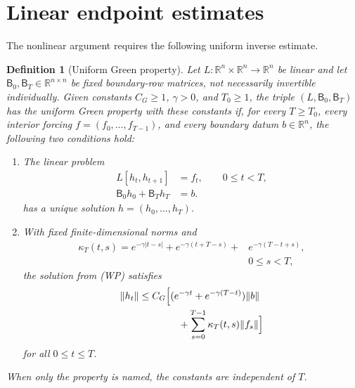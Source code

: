 \documentclass[twocolumn,nameyear,amsthm]{autart}
\newcommand{\R}{\mathbb R}
\newcommand{\Bzero}{\mathsf B_0}
\newcommand{\BT}{\mathsf B_T}
\newcommand{\norm}[1]{\lVert #1\rVert}
\numberwithin{equation}{section}
\newtheorem{definition}[theorem]{Definition}
\begin{document}
\section{Linear endpoint estimates}\label{sec:inverse}
The nonlinear argument requires the following uniform inverse estimate.
\begin{definition}[Uniform Green property]\label{cond:green}
Let $L:\mathbb R^n\times\mathbb R^n\to\mathbb R^n$ be linear and let $\Bzero,\BT\in\mathbb R^{n\times n}$ be fixed boundary-row matrices, not necessarily invertible individually.  Given constants $C_G\ge1$, $\gamma>0$, and $T_0\ge1$, the triple $(L,\Bzero,\BT)$ has the uniform Green property with these constants if, for every $T\ge T_0$, every interior forcing $f=(f_0,\ldots,f_{T-1})$, and every boundary datum $b\in\R^n$, the following two conditions hold:
\begin{enumerate}
\item[(WP)] The linear problem
\begin{equation}\label{eq:linear-bvp}
\begin{aligned}
      L[h_t,h_{t+1}]&=f_t,\qquad 0\le t<T,\\
      \Bzero h_0+\BT h_T&=b.
\end{aligned}
\end{equation}
has a unique solution $h=(h_0,\ldots,h_T)$.
\item[(G)] With fixed finite-dimensional norms and
\begin{equation}\label{eq:kappa-kernel}
\begin{aligned}
      \kappa_T(t,s)=e^{-\gamma|t-s|}
      +e^{-\gamma(t+T-s)}+&e^{-\gamma(T-t+s)},\\ &0\le s<T,
\end{aligned}
\end{equation}
the solution from \emph{(WP)} satisfies
\begin{equation}\label{eq:green-estimate}
\begin{aligned}
      \norm{h_t}
      &\le C_G\Bigl[(e^{-\gamma t}+e^{-\gamma(T-t)})\norm b\\
      &\hspace{4.0em}
      +\sum_{s=0}^{T-1}\kappa_T(t,s)\norm{f_s}\Bigr]
\end{aligned}
\end{equation}
for all $0\le t\le T$.
\end{enumerate}
When only the property is named, the constants are independent of $T$.
\end{definition}
\end{document}
